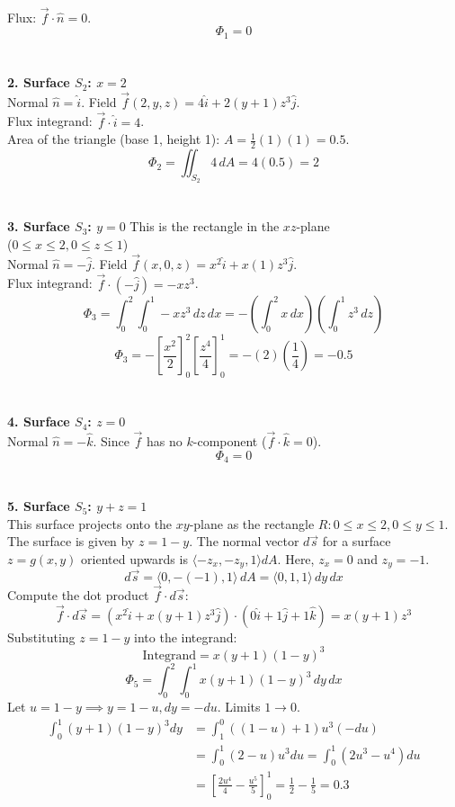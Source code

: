 \documentclass{article}
\begin{document}
\\
Flux: $\vec{f} \cdot \hat{n} = 0$.
\[ \Phi_1 = 0 \]
\\
\\
\textbf{2. Surface $S_2$: $x=2$}
\\
Normal $\hat{n} = \hat{i}$. Field $\vec{f}(2,y,z) = 4\hat{i} + 2(y+1)z^3\hat{j}$.
\\
Flux integrand: $\vec{f} \cdot \hat{i} = 4$.
\\
Area of the triangle (base 1, height 1): $A = \frac{1}{2}(1)(1) = 0.5$.
\[ \Phi_2 = \iint_{S_2} 4 \, dA = 4(0.5) = 2 \]
\\
\\
\textbf{3. Surface $S_3$: $y=0$}
This is the rectangle in the $xz$-plane
\\
($0 \le x \le 2, 0 \le z \le 1$)
\\
Normal $\hat{n} = -\hat{j}$. Field $\vec{f}(x,0,z) = x^2\hat{i} + x(1)z^3\hat{j}$.
\\
Flux integrand: $\vec{f} \cdot (-\hat{j}) = -xz^3$.
\[
	\Phi_3 = \int_0^2 \int_0^1 -xz^3 \, dz \, dx = -\left( \int_0^2 x \, dx \right) \left( \int_0^1 z^3 \, dz \right)
\]
\[
	\Phi_3 = - \left[ \frac{x^2}{2} \right]_0^2 \left[ \frac{z^4}{4} \right]_0^1 = -(2)\left(\frac{1}{4}\right) = -0.5
\]
\\
\\
\textbf{4. Surface $S_4$: $z=0$}
\\
Normal $\hat{n} = -\hat{k}$. Since $\vec{f}$ has no $k$-component ($\vec{f} \cdot \hat{k} = 0$).
\[ \Phi_4 = 0 \]
\\
\\
\textbf{5. Surface $S_5$: $y+z=1$}
\\
This surface projects onto the $xy$-plane as the rectangle
$R: 0 \le x \le 2, 0 \le y \le 1$.
The surface is given by $z = 1-y$.
The normal vector $d\vec{s}$ for a surface $z=g(x,y)$ oriented upwards is
$\langle -z_x, -z_y, 1 \rangle dA$.
Here, $z_x = 0$ and $z_y = -1$.
\[
	d\vec{s} = \langle 0, -(-1), 1 \rangle \, dA = \langle 0, 1, 1 \rangle \, dy \, dx
\]
Compute the dot product $\vec{f} \cdot d\vec{s}$:
\[
	\vec{f} \cdot d\vec{s} = (x^2\hat{i} + x(y+1)z^3\hat{j}) \cdot (0\hat{i} + 1\hat{j} + 1\hat{k}) = x(y+1)z^3
\]
Substituting $z = 1-y$ into the integrand:
\[
	\text{Integrand} = x(y+1)(1-y)^3
\]
\[
	\Phi_5 = \int_0^2 \int_0^1 x(y+1)(1-y)^3 \, dy \, dx
\]
Let $u = 1-y \implies y = 1-u, dy = -du$. Limits $1 \to 0$.
\begin{align*}
	\int_0^1 (y+1)(1-y)^3 dy & = \int_1^0 ((1-u)+1)u^3 (-du)                                                         \\
	                         & = \int_0^1 (2-u)u^3 du = \int_0^1 (2u^3 - u^4) du                                     \\
	                         & = \left[ \frac{2u^4}{4} - \frac{u^5}{5} \right]_0^1 = \frac{1}{2} - \frac{1}{5} = 0.3
\end{align*}
\end{document}
